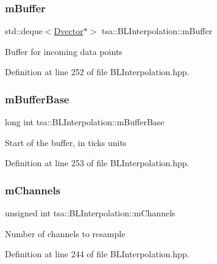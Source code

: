 \subsubsection{\texorpdfstring{m\+Buffer}{mBuffer}}
{\footnotesize\ttfamily std\+::deque$<$\hyperlink{namespacetsa_a8900fb03d849baf447a1a0efe2561fb2}{Dvector}$\ast$$>$ tsa\+::\+B\+L\+Interpolation\+::m\+Buffer\hspace{0.3cm}{\ttfamily [private]}}

Buffer for incoming data points 

Definition at line 252 of file B\+L\+Interpolation.\+hpp.

\mbox{\label{classtsa_1_1_b_l_interpolation_a7e179ad859cffc61384efe0bc841255b}} 
\subsubsection{\texorpdfstring{m\+Buffer\+Base}{mBufferBase}}
{\footnotesize\ttfamily long int tsa\+::\+B\+L\+Interpolation\+::m\+Buffer\+Base\hspace{0.3cm}{\ttfamily [private]}}

Start of the buffer, in ticks units 

Definition at line 253 of file B\+L\+Interpolation.\+hpp.

\mbox{\label{classtsa_1_1_b_l_interpolation_a1299ee71922f13c989b9961a0adcd14f}} 
\subsubsection{\texorpdfstring{m\+Channels}{mChannels}}
{\footnotesize\ttfamily unsigned int tsa\+::\+B\+L\+Interpolation\+::m\+Channels\hspace{0.3cm}{\ttfamily [private]}}

Number of channels to resample 

Definition at line 244 of file B\+L\+Interpolation.\+hpp.

\mbox{\label{classtsa_1_1_b_l_interpolation_ab0b2cee3d403a0ae8d3cc3d5c0618f02}} 
